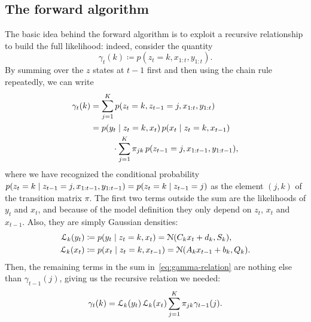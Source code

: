 \documentclass[
  10pt, twocolumn, headings=normal,
  footlines=1, DIV=calc
]{scrartcl}
\begin{document}
\subsection{The forward algorithm}
The basic idea behind the forward algorithm is to exploit a recursive
relationship to build the full likelihood: indeed, consider the quantity
\begin{equation}
  \gamma_{t}(k) \coloneq p(z_{t} = k, x_{1:t}, y_{1:t}).
\end{equation}
By summing over the $z$ states at $t-1$ first and then using the chain rule
repeatedly, we can write
\begin{equation}
  \begin{split}
    \gamma_{t}(k) &= \sum_{j=1}^{K}
      p(z_{t} = k, z_{t-1} = j, x_{1:t}, y_{1:t}) \\
      &= \!\begin{multlined}[t]
        p(y_{t} \given z_{t} = k, x_{t}) \,
        p(x_{t} \given z_{t} = k, x_{t-1}) \\
        \cdot \sum_{j=1}^{K} \pi_{jk}\,
          p(z_{t-1} = j, x_{1:t-1}, y_{1:t-1}),
      \end{multlined}
  \end{split}
  \label{eq:gamma-relation}
\end{equation}
where we have recognized the conditional probability $p(z_{t} = k \;\vert\; z_{t-1}
= j, x_{1:t-1}, y_{1:t-1}) = p(z_{t} = k \;\vert\; z_{t-1} = j)$ as the element
$(j, k)$ of the transition matrix $\pi$. The first two terms outside the sum are
the likelihoods of $y_{t}$ and $x_{t}$, and because of the model definition they
only depend on $z_{t}$, $x_{t}$ and $x_{t-1}$. Also, they are simply Gaussian
densities:
\begin{align}
  \mathcal{L}_{k}(y_{t}) &\coloneq p(y_{t} \;\vert\; z_{t} = k, x_{t})
    = \mathcal{N}(C_{k} x_{t} + d_{k}, S_{k}), \\
  \mathcal{L}_{k}(x_{t}) &\coloneq p(x_{t} \;\vert\; z_{t} = k, x_{t-1})
    = \mathcal{N}(A_{k} x_{t-1} + b_{k}, Q_{k}).
\end{align}
Then, the remaining terms in the sum in~\eqref{eq:gamma-relation} are nothing
else than $\gamma_{t-1}(j)$, giving us the recursive relation we needed:
\begin{equation}
  \gamma_{t}(k) = \mathcal{L}_{k}(y_{t})\, \mathcal{L}_{k}(x_{t})
    \sum_{j=1}^{K} \pi_{jk} \gamma_{t-1}(j).
\end{equation}
\end{document}

